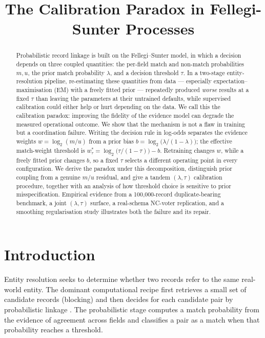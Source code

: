 \documentclass[conference]{IEEEtran}
\title{The Calibration Paradox in Fellegi-Sunter Processes}
\author{\IEEEauthorblockN{Denis Robert}\IEEEauthorblockA{\textit{Independent Researcher}}}
\begin{document}
\maketitle

\begin{abstract}
Probabilistic record linkage is built on the Fellegi--Sunter model, in which a decision
depends on three coupled quantities: the per-field match and non-match probabilities
$m,u$, the prior match probability $\lambda$, and a decision threshold $\tau$. In a
two-stage entity-resolution pipeline, re-estimating these quantities from data ---
especially expectation--maximisation (EM) with a freely fitted prior --- repeatedly produced
\emph{worse} results at a fixed $\tau$ than leaving the parameters at their untrained
defaults, while supervised calibration could either help or hurt depending on the data.
We call this the calibration paradox: improving the fidelity of the evidence model can
degrade the measured operational outcome. We show that the mechanism is not a flaw in
training but a coordination failure. Writing the decision rule in log-odds separates the
evidence weights $w=\log_2(m/u)$ from a prior bias $b=\log_2\bigl(\lambda/(1-\lambda)\bigr)$;
the effective match-weight threshold is
$w_\tau^*=\log_2\bigl(\tau/(1-\tau)\bigr)-b$. Retraining changes $w$, while a freely fitted
prior changes $b$, so a fixed $\tau$ selects a different operating point in every
configuration. We derive the paradox under this decomposition, distinguish prior coupling
from a genuine $m/u$ residual, and give a tandem $(\lambda,\tau)$ calibration procedure,
together with an analysis of how threshold choice is sensitive to prior misspecification.
Empirical evidence from a 100,000-record duplicate-bearing benchmark, a joint
$(\lambda,\tau)$ surface, a real-schema NC-voter replication, and a smoothing
regularisation study illustrates both the failure and its repair.
\end{abstract}

\section{Introduction}
Entity resolution seeks to determine whether two records refer to the same real-world
entity. The dominant computational recipe first retrieves a small set of candidate records
(blocking) and then decides for each candidate pair by probabilistic linkage
\cite{fellegi1969,christen2012}. The probabilistic stage computes a match probability from
the evidence of agreement across fields and classifies a pair as a match when that
probability reaches a threshold.
\end{document}
